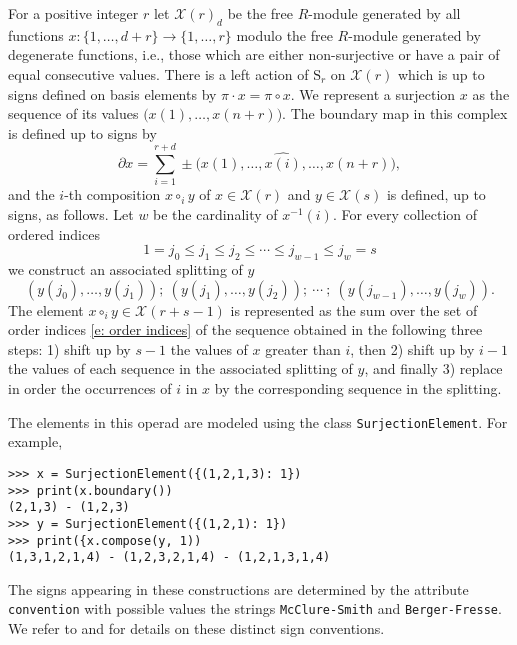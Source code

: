 \documentclass{amsart}
\renewcommand{\S}{\mathrm{S}}
\newcommand{\X}{\mathcal X}
\begin{document}
For a positive integer $r$ let $\mathcal X(r)_d$ be the free $R$-module generated by all functions $x : \{1, \dots, d+r\} \to \{1, \dots, r\}$ modulo the free $R$-module generated by degenerate functions, i.e., those which are either non-surjective or have a pair of equal consecutive values.
There is a left action of $\S_r$ on $\mathcal X(r)$ which is up to signs defined on basis elements by $\pi \cdot x = \pi \circ x$.
We represent a surjection $x$ as the sequence of its values $\big( x(1), \dots, x(n+r) \big)$.
The boundary map in this complex is defined up to signs by
\begin{equation*}
\partial x = \sum_{i = 1}^{r+d} \pm \big( x(1), \dots, \widehat{x(i)}, \dots, x(n+r) \big),
\end{equation*}
and the $i$-th composition $x \circ_i y$ of $x \in \mathcal X(r)$ and $y \in \mathcal X(s)$ is defined, up to signs, as follows.
Let $w$ be the cardinality of $x^{-1}(i)$.
For every collection of ordered indices
\begin{equation} \label{e: order indices}
1 = j_0 \leq j_1 \leq j_2 \leq \cdots \leq j_{w-1} \leq j_w = s
\end{equation}
we construct an associated splitting of $y$
\begin{equation*}
(y(j_0), \dots, y(j_1));\ (y(j_1), \dots, y(j_2));\ \cdots \ ;\ (y(j_{w-1}), \dots, y(j_w)).
\end{equation*}
The element $x \circ_i y \in \X(r+s-1)$ is represented as the sum over the set of order indices \eqref{e: order indices} of the sequence obtained in the following three steps: 1) shift up by $s-1$ the values of $x$ greater than $i$, then 2) shift up by $i-1$ the values of each sequence in the associated splitting of $y$, and finally 3) replace in order the occurrences of $i$ in $x$ by the corresponding sequence in the splitting.

The elements in this operad are modeled using the class \texttt{SurjectionElement}.
For example,

\begin{Verbatim}[frame=lines, samepage=true]
>>> x = SurjectionElement({(1,2,1,3): 1})
>>> print(x.boundary())
(2,1,3) - (1,2,3)
>>> y = SurjectionElement({(1,2,1): 1})
>>> print({x.compose(y, 1))
(1,3,1,2,1,4) - (1,2,3,2,1,4) - (1,2,1,3,1,4)
\end{Verbatim}

The signs appearing in these constructions are determined by the attribute \texttt{convention} with possible values the strings \texttt{McClure-Smith} and \texttt{Berger-Fresse}.
We refer to \cite{McClureSmith03} and \cite{BergerFresse04} for details on these distinct sign conventions.
\end{document}
